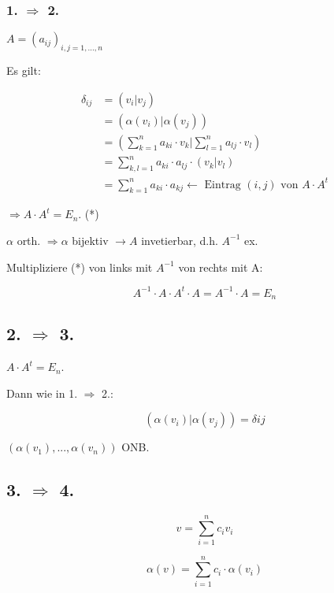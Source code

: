 \documentclass[a4paper, openany]{book}
\begin{document}
        \subsubsection*{1. $\Rightarrow$ 2.}

        $A = (a_{ij})_{i,j =1,...,n}$

        Es gilt:

        \begin{align*}
          \delta_{ij} & =  (v_i|v_j)  \\ & = (\alpha(v_i)|\alpha(v_j)) \\
                                  & = (\sum_{k=1}^n a_{ki} \cdot v_k | \sum_{l=1}^n a_{lj} \cdot v_l) \\
                                  & = \sum_{k,l=1}^n a_{ki} \cdot a_{lj} \cdot (v_k | v_l) \\
                                  & = \sum_{k=1}^n a_{ki} \cdot a_{kj} \leftarrow \text{ Eintrag $(i,j)$ von $A \cdot A^t$}
        \end{align*}

        $\Rightarrow A \cdot A^t = E_n$. (*)

        $\alpha$ orth. $\Rightarrow \alpha$ bijektiv $\rightarrow A$ invetierbar, d.h. $A^{-1}$ ex.

        \par \medskip

        Multipliziere (*) von links mit $A^{-1}$ von rechts mit A:

        \[ A^{-1} \cdot A \cdot A^t \cdot A = A^{-1} \cdot A = E_n \]

        \subsection*{2. $\Rightarrow$ 3.}

        $A \cdot A^t = E_n$.

        Dann wie in 1. $\Rightarrow$ 2.:

        \[ (\alpha(v_i) | \alpha(v_j)) = \delta{ij} \]

        $(\alpha(v_1), ..., \alpha(v_n))$ ONB.

        \subsection*{3. $\Rightarrow$ 4.}

        \[ v = \sum_{i=1}^n c_i v_i \]

        \[ \alpha(v) = \sum_{i=1}^n c_i \cdot \alpha(v_i) \]
\end{document}
